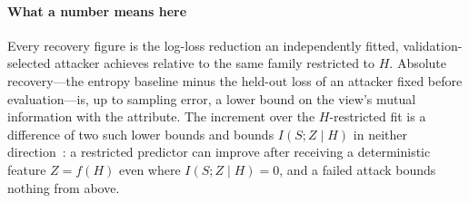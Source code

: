 \paragraph{What a number means here} Every recovery figure is the log-loss reduction an independently
fitted, validation-selected attacker achieves relative to the same family restricted to $H$. Absolute
recovery---the entropy baseline minus the held-out loss of an attacker fixed before evaluation---is, up
to sampling error, a lower bound on the view's mutual information with the attribute. The increment over
the $H$-restricted fit is a difference of two such lower bounds and bounds $I(S;Z\mid H)$ in neither
direction~\cite{mcallester2020formal}: a restricted predictor can improve after receiving a deterministic
feature $Z=f(H)$ even where $I(S;Z\mid H)=0$, and a failed attack bounds nothing from above.
